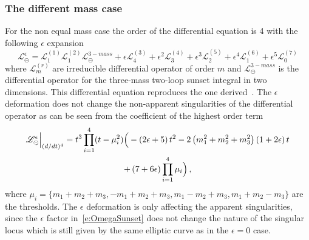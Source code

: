 \documentclass[a4paper,12pt]{article}
\numberwithin{equation}{section}
\numberwithin{figure}{section}
\def\su{\circleddash}
\begin{document}
\subsubsection{The different mass case}\label{sec:2sunset3mass}

For the non equal mass case the order of the differential equation is
4 with the following $\epsilon$ expansion
\begin{equation}
     \mathscr{L}^{\epsilon}_\su =   \mathscr{L}^{(1)}_1
     \mathscr{L}^{(2)}_1    \mathscr{L}^{3-mass}_\su +\epsilon
     \mathscr{L}^{(3)}_4+\epsilon^2  \mathscr{L}^{(4)}_3+\epsilon^3
     \mathscr{L}^{(5)}_2+ \epsilon^4 \mathscr{L}^{(6)}_1 +\epsilon^5
    \mathscr{L}^{(7)}_0
   \end{equation} 
   where $ \mathscr{L}^{(r)}_m$  are irreducible differential operator
   of  order $m$ and $\mathscr{L}^{3-mass}_\su$ is the differential
   operator for the three-mass two-loop sunset integral in two
   dimensions. This differential equation reproduces the one 
   derived~\cite{Remiddi:2013joa,Remiddi:2016gno}.
%
The $\epsilon$ deformation does not change the non-apparent
singularities of the differential operator as can be seen from the
coefficient of the highest order term
\begin{multline}
  \mathscr{L}^{\epsilon}_\su \Big\vert_{(d/dt)^4}= t^3\prod_{i=1}^4 (t-
  \mu_i^2) \Big(-\left(2 \epsilon +5\right) t^{2}-2
    \left(m_{1}^{2}+m_{2}^{2}+m_{3}^{2}\right) \left(1+2 \epsilon
    \right) t \cr+ \left(7+6 \epsilon \right)\prod_{i=1}^4 \mu_i
\Big)  \, , 
\end{multline}
where $\mu_i=\{m_1+m_2+m_3,-m_1+m_2+m_3,m_1-m_2+m_3,m_1+m_2-m_3\}$ are
the thresholds.  The $\epsilon$ deformation is only affecting the
apparent singularities, since the $\epsilon$ factor
in~\eqref{e:OmegaSunset} does not change the nature of the singular
locus which is still given by the same elliptic curve as in the
$\epsilon=0$ case.
   
\end{document}
